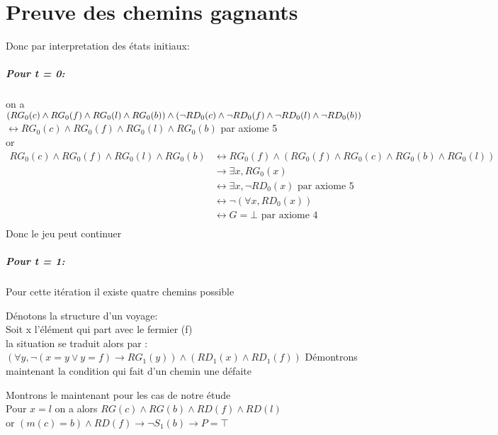 \documentclass{article}
\begin{document}
\begin{center}
\end{center}


\section*{Preuve des chemins gagnants}

Donc par interpretation des états initiaux:

\subparagraph*{Pour t = 0:}
on a $(RG_0(c) \wedge RG_0(f) \wedge RG_0(l) \wedge RG_0(b)) \wedge (\neg RD_0(c) \wedge \neg RD_0(f) \wedge \neg RD_0(l) \wedge \neg RD_0(b))\\ $
$\leftrightarrow RG_0(c) \wedge RG_0(f) \wedge RG_0(l) \wedge RG_0(b)$ par axiome 5\\

or
\begin{align*}
  RG_0(c) \wedge RG_0(f) \wedge RG_0(l) \wedge RG_0(b) &
  \leftrightarrow RG_0(f) \wedge (RG_0(f) \wedge RG_0(c) \wedge RG_0(b) \wedge RG_0(l))\\
  &\rightarrow \exists x , RG_0(x)\\
  &\leftrightarrow \exists x, \neg RD_0(x) \text{ par axiome 5}\\
  &\leftrightarrow \neg (\forall x, RD_0(x))\\
  &\leftrightarrow G = \bot \text{ par axiome 4} \\
\end{align*}
Donc le jeu peut continuer

\subparagraph*{Pour t = 1:}

Pour cette itération il existe quatre chemins possible

Dénotons la structure d'un voyage:\\
Soit x l'élément qui part avec le fermier (f)\\
la situation se traduit alors par :\\
$(\forall y , \neg(x = y \vee y = f) \rightarrow RG_1(y)) \wedge (RD_1(x) \wedge RD_1(f))$
Démontrons maintenant la condition qui fait d'un chemin une défaite

Montrons le maintenant pour les cas de notre étude\\
Pour $x=l$
on a alors $RG(c)\wedge RG(b) \wedge RD(f) \wedge RD(l)$\\
or $(m(c)=b) \wedge RD(f) \rightarrow \neg S_1(b) \rightarrow P = \top$
\end{document}
